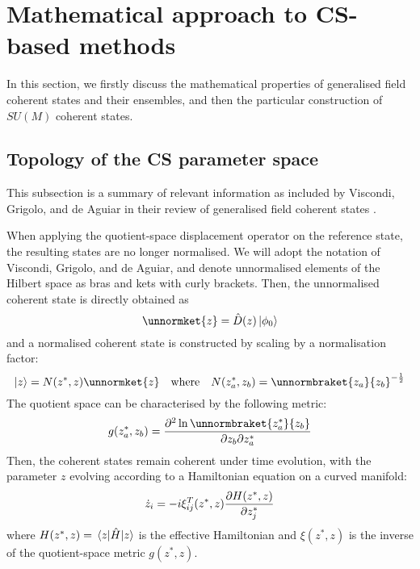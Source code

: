\section{Mathematical approach to CS-based methods}\label{sec:mathematical_approach}
In this section, we firstly discuss the mathematical properties of generalised field coherent states and their ensembles, and then the particular construction of $SU(M)$ coherent states.
	
\subsection{Topology of the CS parameter space}
This subsection is a summary of relevant information as included by Viscondi, Grigolo, and de Aguiar in their review of generalised field coherent states \cite{aguiar}.

When applying the quotient-space displacement operator on the reference state, the resulting states are no longer normalised. We will adopt the notation of Viscondi, Grigolo, and de Aguiar, and denote unnormalised elements of the Hilbert space as bras and kets with curly brackets. Then, the unnormalised coherent state is directly obtained as
\begin{equation}
\unnormket{z}=\hat{D}(z)\ket{\phi_0}
\end{equation}
and a normalised coherent state is constructed by scaling by a normalisation factor:
\begin{equation}
\ket{z}=N(z^*, z)\unnormket{z}\qq{where}N(z_a^*, z_b)=\unnormbraket{z_a}{z_b}^{-\frac{1}{2}}
\end{equation}
The quotient space can be characterised by the following metric:
\begin{equation}
g(z_a^*, z_b)=\pdv{\ln\unnormbraket{z_a^*}{z_b}}{z_b}{z_a^*}
\end{equation} 
Then, the coherent states remain coherent under time evolution, with the parameter $z$ evolving according to a Hamiltonian equation on a curved manifold:
\begin{equation} \label{eq:single_z_prop}
\dot{z}_i=-i\xi^T_{ij}(z^*, z)\pdv{H(z^*, z)}{z_j^*}
\end{equation}
where $H(z^*, z)=\mel{z}{\hat{H}}{z}$ is the effective Hamiltonian and $\xi(z^*, z)$ is the inverse of the quotient-space metric $g(z^*, z)$.

	
